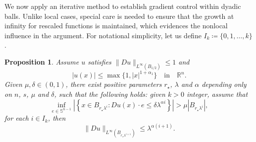 \documentclass[reqno,11pt]{amsart}
\newtheorem{proposition}{Proposition}[section]
\numberwithin{equation}{section}
\numberwithin{equation}{section}
\begin{document}
We now apply an iterative method to establish gradient control within dyadic balls. Unlike local cases, special care is needed to ensure that the growth at infinity for rescaled functions is maintained, which evidences the nonlocal influence in the argument. For notational simplicity, let us define \( I_k \coloneqq \{0, 1, \dots, k\} \).

\begin{proposition}\label{reg-at-critical-points} 
Assume $u$ satisfies $\|Du\|_{L^\infty(B_{1/2})} \leq 1$ and
$$
    |u(x)|\leq \max\{1,|x|^{1+\alpha_1}\} \quad \mbox{in} \quad \mathbb{R}^n.
$$
Given $\mu, \delta \in (0,1)$, there exist positive parameters $r_\star$, $\lambda$ and $\alpha$ depending only on $n$, $s$, $\mu$ and $\delta$, such that the following holds: given $k>0$ integer, assume that
\begin{equation}\label{positivity every direction}
    \inf_{e \in \mathbb{S}^{n-1}}\left|\left\{x \in B_{r_\star\lambda^i}\colon Du(x) \cdot e \leq \delta \lambda^{\alpha i}  \right\} \right| > \mu |B_{r_\star \lambda^i}|,
\end{equation}
for each $i \in I_k$, then
\begin{equation}\label{boladouro}  \|Du\|_{L^\infty(B_{r_\star \lambda^{i+1}})} \leq \lambda^{\alpha(i+1)}.
\end{equation}
\end{proposition}
\end{document}
